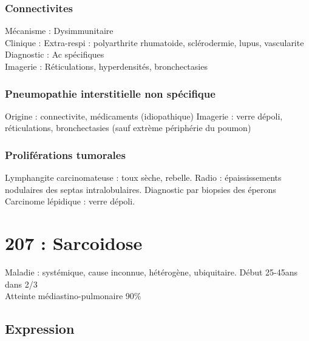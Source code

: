 \subsubsection{Connectivites}
Mécanisme : Dysimmunitaire\\
Clinique : Extra-respi : polyarthrite rhumatoide, sclérodermie, lupus, vascularite\\
Diagnostic : Ac spécifiques\\
Imagerie : Réticulations, hyperdensités, bronchectasies

\subsubsection{Pneumopathie interstitielle non spécifique}
Origine : connectivite, médicaments (idiopathique)
Imagerie : verre dépoli, réticulations, bronchectasies (sauf extrème périphérie du poumon)

\subsubsection{Proliférations tumorales}
Lymphangite carcinomateuse : toux sèche, rebelle. Radio : épaississements nodulaires des septas intralobulaires. Diagnostic par biopsies des éperons\\
Carcinome lépidique : verre dépoli. 


\section{207 : Sarcoidose}
Maladie : systémique, cause inconnue, hétérogène, ubiquitaire. Début 25-45ans
dans 2/3\\
Atteinte médiastino-pulmonaire 90\%

\subsection{Expression}
\label{sec:org39048da}
